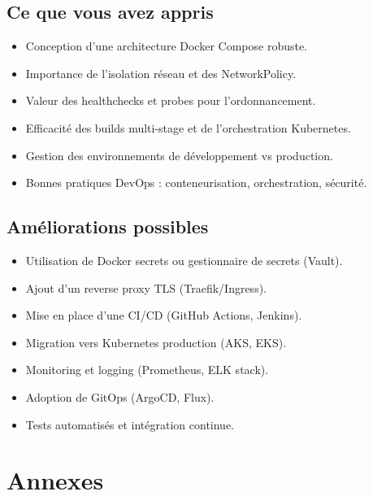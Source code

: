 \documentclass[11pt,a4paper,oneside]{report}
\begin{document}
\section{Ce que vous avez appris}
\begin{itemize}
\item Conception d'une architecture Docker Compose robuste.
\item Importance de l'isolation réseau et des NetworkPolicy.
\item Valeur des healthchecks et probes pour l'ordonnancement.
\item Efficacité des builds multi-stage et de l'orchestration Kubernetes.
\item Gestion des environnements de développement vs production.
\item Bonnes pratiques DevOps : conteneurisation, orchestration, sécurité.
\end{itemize}

\section{Améliorations possibles}
\begin{itemize}
\item Utilisation de Docker secrets ou gestionnaire de secrets (Vault).
\item Ajout d'un reverse proxy TLS (Traefik/Ingress).
\item Mise en place d'une CI/CD (GitHub Actions, Jenkins).
\item Migration vers Kubernetes production (AKS, EKS).
\item Monitoring et logging (Prometheus, ELK stack).
\item Adoption de GitOps (ArgoCD, Flux).
\item Tests automatisés et intégration continue.
\end{itemize}

\chapter{Annexes}
\end{document}
